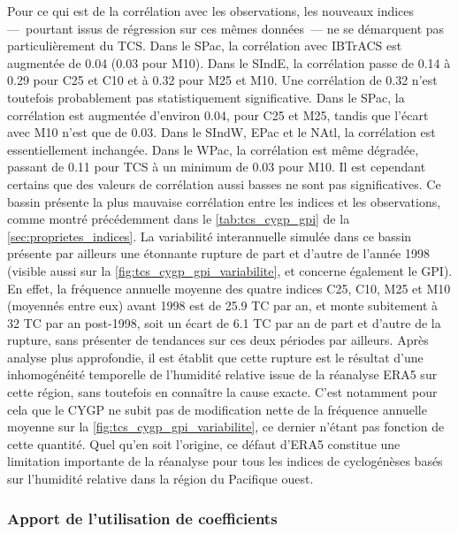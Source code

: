 \documentclass[../main.tex]{subfiles}
\begin{document}
Pour ce qui est de la corrélation avec les observations, les nouveaux indices ---~pourtant issus de régression sur ces mêmes données~--- ne se démarquent pas
particulièrement du TCS. Dans le SPac, la corrélation avec IBTrACS est augmentée de \num{0.04} (\num{0.03} pour M10). Dans le SIndE, la corrélation passe de
\num{0.14} à \num{0.29} pour C25 et C10 et à \num{0.32} pour M25 et M10. Une corrélation de \num{0.32} n'est toutefois probablement pas statistiquement
significative. Dans le SPac, la corrélation est augmentée d'environ \num{0.04}, pour C25 et M25, tandis que l'écart avec M10 n'est que de \num{0.03}. Dans le
SIndW, EPac et le NAtl, la corrélation est essentiellement inchangée. Dans le WPac, la corrélation est même dégradée, passant de \num{0.11} pour TCS à un
minimum de \num{0.03} pour M10. Il est cependant certains que des valeurs de corrélation aussi basses ne sont pas significatives. Ce bassin présente la plus
mauvaise corrélation entre les indices et les observations, comme montré précédemment dans le \cref{tab:tcs_cygp_gpi} de la \cref{sec:proprietes_indices}. La
variabilité interannuelle simulée dans ce bassin présente par ailleurs une étonnante rupture de part et d'autre de l'année \num{1998} (visible aussi sur la
\cref{fig:tcs_cygp_gpi_variabilite}, et concerne également le GPI). En effet, la fréquence annuelle moyenne des quatre indices C25, C10, M25 et M10 (moyennés
entre eux) avant 1998 est de \num{25.9} TC par an, et monte subitement à \num{32} TC par an post-\num{1998}, soit un écart de \num{6.1} TC par an de part et
d'autre de la rupture, sans présenter de tendances sur ces deux périodes par ailleurs. Après analyse plus approfondie, il est établit que cette rupture est le
résultat d'une inhomogénéité temporelle de l'humidité relative issue de la réanalyse ERA5 sur cette région, sans toutefois en connaître la cause exacte. C'est
notamment pour cela que le CYGP ne subit pas de modification nette de la fréquence annuelle moyenne sur la \cref{fig:tcs_cygp_gpi_variabilite}, ce dernier
n'étant pas fonction de cette quantité. Quel qu'en soit l'origine, ce défaut d'ERA5 constitue une limitation importante de la réanalyse pour tous les indices
de cyclogénèses basés sur l'humidité relative dans la région du Pacifique ouest.

\subsubsection{Apport de l'utilisation de coefficients }\label{sec:diagnostique_rang}
\end{document}

